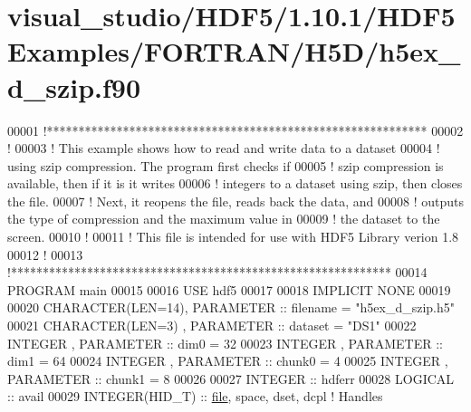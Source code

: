 \hypertarget{visual__studio_2_h_d_f5_21_810_81_2_h_d_f5_examples_2_f_o_r_t_r_a_n_2_h5_d_2h5ex__d__szip_8f90_source}{}\section{visual\+\_\+studio/\+H\+D\+F5/1.10.1/\+H\+D\+F5\+Examples/\+F\+O\+R\+T\+R\+A\+N/\+H5\+D/h5ex\+\_\+d\+\_\+szip.f90}
\label{visual__studio_2_h_d_f5_21_810_81_2_h_d_f5_examples_2_f_o_r_t_r_a_n_2_h5_d_2h5ex__d__szip_8f90_source}

\begin{DoxyCode}
00001 \textcolor{comment}{!************************************************************}
00002 \textcolor{comment}{!}
00003 \textcolor{comment}{!  This example shows how to read and write data to a dataset}
00004 \textcolor{comment}{!  using szip compression.    The program first checks if}
00005 \textcolor{comment}{!  szip compression is available, then if it is it writes}
00006 \textcolor{comment}{!  integers to a dataset using szip, then closes the file.}
00007 \textcolor{comment}{!  Next, it reopens the file, reads back the data, and}
00008 \textcolor{comment}{!  outputs the type of compression and the maximum value in}
00009 \textcolor{comment}{!  the dataset to the screen.}
00010 \textcolor{comment}{!}
00011 \textcolor{comment}{!  This file is intended for use with HDF5 Library verion 1.8}
00012 \textcolor{comment}{!}
00013 \textcolor{comment}{!************************************************************}
00014 \textcolor{keyword}{PROGRAM} main
00015 
00016   \textcolor{keywordtype}{USE }hdf5
00017 
00018   \textcolor{keywordtype}{IMPLICIT NONE}
00019 
00020   \textcolor{keywordtype}{CHARACTER(LEN=14)}, \textcolor{keywordtype}{PARAMETER} :: filename = \textcolor{stringliteral}{"h5ex\_d\_szip.h5"}
00021   \textcolor{keywordtype}{CHARACTER(LEN=3)} , \textcolor{keywordtype}{PARAMETER} :: dataset  = \textcolor{stringliteral}{"DS1"}
00022   \textcolor{keywordtype}{INTEGER}          , \textcolor{keywordtype}{PARAMETER} :: dim0     = 32
00023   \textcolor{keywordtype}{INTEGER}          , \textcolor{keywordtype}{PARAMETER} :: dim1     = 64
00024   \textcolor{keywordtype}{INTEGER}          , \textcolor{keywordtype}{PARAMETER} :: chunk0   = 4
00025   \textcolor{keywordtype}{INTEGER}          , \textcolor{keywordtype}{PARAMETER} :: chunk1   = 8
00026 
00027   \textcolor{keywordtype}{INTEGER} :: hdferr
00028   \textcolor{keywordtype}{LOGICAL}         :: avail
00029   \textcolor{keywordtype}{INTEGER(HID\_T)}  :: \hyperlink{structfile}{file}, space, dset, dcpl \textcolor{comment}{! Handles}

\end{DoxyCode}
